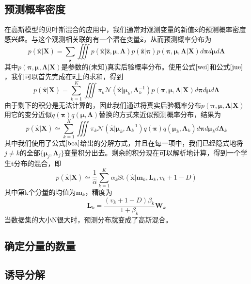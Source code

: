 \subsection*{预测概率密度}
在高斯模型的贝叶斯混合的应用中，我们通常对观测变量的新值$\hat{\boldsymbol{x}}$的预测概率密度感兴趣。与这个观测相关联的有一个潜在变量$\hat{\boldsymbol{z}}$，从而预测概率分布为
\begin{equation}
	p(\hat{\boldsymbol{x}}|\boldsymbol{X})=\sum_{\hat{\boldsymbol{z}}}\iiint p(\hat{\boldsymbol{x}}|\hat{\boldsymbol{z}},\boldsymbol{\mu},\boldsymbol{\Lambda})p(\hat{\boldsymbol{z}}|\boldsymbol{\pi})p(\boldsymbol{\pi},\boldsymbol{\mu},\boldsymbol{\Lambda}|\boldsymbol{X})d\boldsymbol{\pi}d\boldsymbol{\mu}d\boldsymbol{\Lambda}
\end{equation}
其中$p(\boldsymbol{\pi},\boldsymbol{\mu},\boldsymbol{\Lambda}|\boldsymbol{X})$是参数的(未知)真实后验概率分布。使用公式$\ref{wei}$和公式$\ref{jue}$，我们可以首先完成在$\hat{\boldsymbol{z}}$上的求和，得到 
\begin{equation}
	p(\hat{\boldsymbol{x}}|\boldsymbol{X})=\sum_{k=1}^{K}\iiint \pi_k\mathcal{N}(\hat{\boldsymbol{x}}|\boldsymbol{\mu}_k,\boldsymbol{\Lambda}_k^{-1})p(\boldsymbol{\pi},\boldsymbol{\mu},\boldsymbol{\Lambda}|\boldsymbol{X})d\boldsymbol{\pi}d\boldsymbol{\mu}d\boldsymbol{\Lambda}
\end{equation}
由于剩下的积分是无法计算的，因此我们通过将真实后验概率分布$p(\boldsymbol{\pi},\boldsymbol{\mu},\boldsymbol{\Lambda}|\boldsymbol{X})$用它的变分近似$q(\boldsymbol{\pi})q(\boldsymbol{\mu},\boldsymbol{\Lambda})$替换的方式来近似预测概率分布，结果为
\begin{equation}
		p(\hat{\boldsymbol{x}}|\boldsymbol{X})\simeq \sum_{k=1}^{K}\iiint \pi_k\mathcal{N}(\hat{\boldsymbol{x}}|\boldsymbol{\mu}_k,\boldsymbol{\Lambda}_k^{-1})q(\boldsymbol{\pi})q(\boldsymbol{\mu}_k,\boldsymbol{\Lambda}_k)d\boldsymbol{\pi}d\boldsymbol{\mu}_kd\boldsymbol{\Lambda}_k
\end{equation}
其中我们使用了公式$\ref{bea}$给出的分解方式，并且在每一项中，我们已经隐式地将$j\ne k$的全部$\{\boldsymbol{\mu}_j,\boldsymbol{\Lambda}_j \}$变量积分出去。剩余的积分现在可以解析地计算，得到一个学生t分布的混合，即
\begin{equation}
	p(\hat{\boldsymbol{x}}|\boldsymbol{X})\simeq\frac{1}{\hat{\alpha}}\sum_{k=1}^{K}\alpha_k\mathrm{St}(\hat{\boldsymbol{x}}|\boldsymbol{m}_k,\boldsymbol{L}_k,v_k+1-D)
\end{equation}
其中第k个分量的均值为$\boldsymbol{m}_k$，精度为
\begin{equation}
	\boldsymbol{L}_k=\frac{(v_k+1-D)\beta_k}{1+\beta_k}\boldsymbol{W}_k
\end{equation}
当数据集的大小N很大时，预测分布就变成了高斯混合。
\subsection*{确定分量的数量}
\subsection*{诱导分解}
